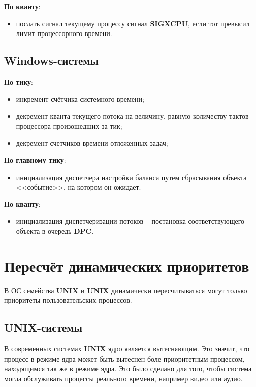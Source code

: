 \textbf{По кванту}:

\begin{itemize}
    \item послать сигнал текущему процессу сигнал \textbf{SIGXCPU}, если тот превысил лимит процессорного времени.
\end{itemize}


\section{Windows-системы}

\textbf{По тику}:

\begin{itemize}
    \item инкремент счётчика системного времени;
    \item декремент кванта текущего потока на величину, равную количеству тактов процессора произошедших за тик;
    \item декремент счетчиков времени отложенных задач;
\end{itemize}

\textbf{По главному тику}:

\begin{itemize}
    \item инициализация диспетчера настройки баланса путем сбрасывания объекта <<событие>>, на котором он ожидает.
\end{itemize}

\textbf{По кванту}:

\begin{itemize}
    \item инициализация диспетчеризации потоков -- постановка соответствующего объекта в очередь \textbf{DPC}.
\end{itemize}

\chapter{Пересчёт динамических приоритетов}

В ОС семейства \textbf{UNIX} и \textbf{UNIX} динамически пересчитываться  могут только приоритеты пользовательских процессов.

\section{UNIX-системы}

В современных системах \textbf{UNIX} ядро является вытесняющим. Это значит, что процесс в режиме ядра может быть вытеснен боле приоритетным процессом, находящимся так же в режиме ядра. Это было сделано для того, чтобы система могла обслуживать процессы реального времени, например видео или аудио.

